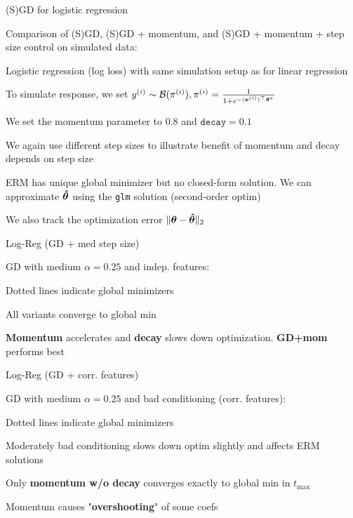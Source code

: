 \documentclass[11pt,compress,t,notes=noshow, xcolor=table]{beamer}
\begin{document}
\begin{framei}{(S)GD for logistic regression}
\item[] Comparison of (S)GD, (S)GD + momentum, and (S)GD + momentum + step size control on simulated data:
\vfill
\item Logistic regression (log loss) with same simulation setup as for linear regression
\item To simulate response, we set $y^{(i)} \sim \mathcal{B}(\pi^{(i)}), \pi^{(i)} = \frac{1}{1+e^{-(\bm{x}^{(i)})^{\top}\bm{\theta}^{\ast}}}$
\item We set the momentum parameter to $0.8$ and $\texttt{decay}=0.1$
\item We again use different step sizes to illustrate benefit of momentum and decay depends on step size
\item ERM has unique global minimizer but no closed-form solution. We can approximate $\bm{\hat\theta}$ using the \texttt{glm} solution (second-order optim)
\item We also track the optimization error $\Vert \bm{\theta} - \bm{\hat\theta} \Vert_2$
\end{framei}


\begin{framei}[fs=small]{Log-Reg (GD + med step size)}
\item GD with medium $\alpha=0.25$ and indep. features:
\item Dotted lines indicate global minimizers
\item All variants converge to global min
\item \textbf{Momentum} accelerates and \textbf{decay} slows down optimization. \textbf{GD+mom} performs best
\end{framei}


\begin{framei}[fs=footnotesize]{Log-Reg (GD + corr. features)}
\item GD with medium $\alpha=0.25$ and bad conditioning (corr. features):
\item Dotted lines indicate global minimizers
\item Moderately bad conditioning slows down optim slightly and affects ERM solutions
\item Only \textbf{momentum w/o decay} converges exactly to global min in $t_{\text{max}}$
\item Momentum causes "\textbf{overshooting}" of some coefs
\end{framei}
\end{document}
